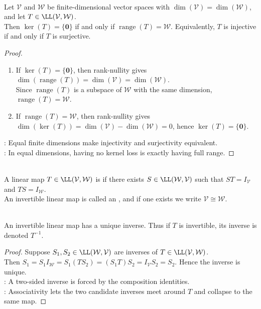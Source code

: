 \begin{corollary} \label{cor:equal-dimension-kernel-range} \\
Let $\mathcal{V}$ and $\mathcal{W}$ be finite-dimensional vector spaces with $\dim(\mathcal{V})=\dim(\mathcal{W})$, and let $T\in\LL(\mathcal{V},\mathcal{W})$.\\
Then $\ker(T)=\{\mathbf{0}\}$ if and only if $\operatorname{range}(T)=\mathcal{W}$. Equivalently, $T$ is injective if and only if $T$ is surjective.
\begin{proof}
\begin{enumerate}[label=\roman*.]
\setlength{\itemsep}{0pt}
\item[$(\Rightarrow)$] If $\ker(T)=\{\mathbf{0}\}$, then rank-nullity gives $\dim(\operatorname{range}(T))=\dim(\mathcal{V})=\dim(\mathcal{W})$.\\
Since $\operatorname{range}(T)$ is a subspace of $\mathcal{W}$ with the same dimension, $\operatorname{range}(T)=\mathcal{W}$.
\item[$(\Leftarrow)$] If $\operatorname{range}(T)=\mathcal{W}$, then rank-nullity gives $\dim(\ker(T))=\dim(\mathcal{V})-\dim(\mathcal{W})=0$, hence $\ker(T)=\{\mathbf{0}\}$.
\end{enumerate}
: Equal finite dimensions make injectivity and surjectivity equivalent.\\
: In equal dimensions, having no kernel loss is exactly having full range.
\end{proof}
\end{corollary}

\begin{definition} \\
A linear map $T \in \LL(\mathcal{V}, \mathcal{W})$ is  if there exists $S \in \LL(\mathcal{W}, \mathcal{V})$ such that $ST = I_{\mathcal{V}}$ and $TS = I_{\mathcal{W}}$.\\
An invertible linear map is called an , and if one exists we write $\mathcal{V} \cong \mathcal{W}$.
\end{definition}

\begin{proposition} \label{prop:inverse-linear-map-is-unique} \\
An invertible linear map has a unique inverse. Thus if $T$ is invertible, its inverse is denoted $T^{-1}$.
\begin{proof}
Suppose $S_1,S_2\in\LL(\mathcal{W},\mathcal{V})$ are inverses of $T\in\LL(\mathcal{V},\mathcal{W})$.\\
Then $S_1 = S_1I_{\mathcal{W}} = S_1(TS_2) = (S_1T)S_2 = I_{\mathcal{V}}S_2 = S_2$. Hence the inverse is unique.\\
: A two-sided inverse is forced by the composition identities.\\
: Associativity lets the two candidate inverses meet around $T$ and collapse to the same map.
\end{proof}
\end{proposition}


